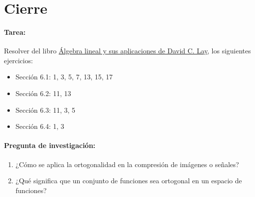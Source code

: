 \documentclass[a4,11pt]{aleph-notas}
\begin{document}
\section*{Cierre}

\paragraph{Tarea:}  
Resolver del libro \href{https://catalogobiblioteca.puce.edu.ec/cgi-bin/koha/opac-detail.pl?biblionumber=86083}{Álgebra lineal y sus aplicaciones de David C. Lay}, los siguientes ejercicios:
\begin{itemize}
    \item Sección 6.1: 1, 3, 5, 7, 13, 15, 17
    \item Sección 6.2: 11, 13
    \item Sección 6.3: 11, 3, 5
    \item Sección 6.4: 1, 3
\end{itemize}

\paragraph{Pregunta de investigación:}  
\begin{enumerate}[leftmargin=*]
    \item ¿Cómo se aplica la ortogonalidad en la compresión de imágenes o señales?
    \item ¿Qué significa que un conjunto de funciones sea ortogonal en un espacio de funciones?
\end{enumerate}
\end{document}
